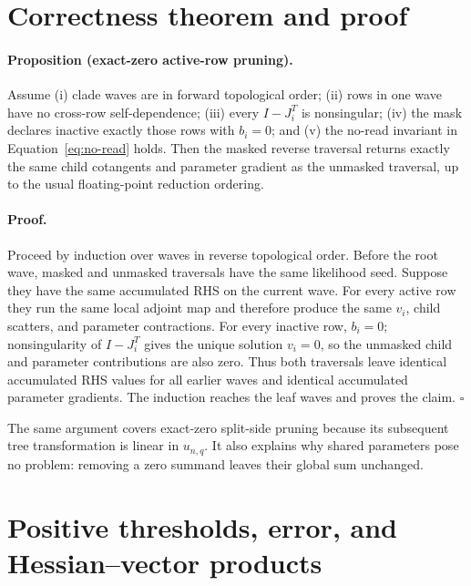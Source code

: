 \documentclass[11pt]{article}
\begin{document}
\section{Correctness theorem and proof}

\paragraph{Proposition (exact-zero active-row pruning).}
Assume (i) clade waves are in forward topological order; (ii) rows in one wave
have no cross-row self-dependence; (iii) every $I-J_i^T$ is nonsingular; (iv)
the mask declares inactive exactly those rows with $b_i=0$; and (v) the
no-read invariant in Equation~\eqref{eq:no-read} holds.  Then the masked
reverse traversal returns exactly the same child cotangents and parameter
gradient as the unmasked traversal, up to the usual floating-point reduction
ordering.

\paragraph{Proof.}
Proceed by induction over waves in reverse topological order.  Before the root
wave, masked and unmasked traversals have the same likelihood seed.  Suppose
they have the same accumulated RHS on the current wave.  For every active row
they run the same local adjoint map and therefore produce the same $v_i$,
child scatters, and parameter contractions.  For every inactive row,
$b_i=0$; nonsingularity of $I-J_i^T$ gives the unique solution $v_i=0$, so the
unmasked child and parameter contributions are also zero.  Thus both
traversals leave identical accumulated RHS values for all earlier waves and
identical accumulated parameter gradients.  The induction reaches the leaf
waves and proves the claim. \hfill$\square$

The same argument covers exact-zero split-side pruning because its subsequent
tree transformation is linear in $u_{n,q}$.  It also explains why shared
parameters pose no problem: removing a zero summand leaves their global sum
unchanged.

\section{Positive thresholds, error, and Hessian--vector products}
\label{sec:error}
\end{document}
